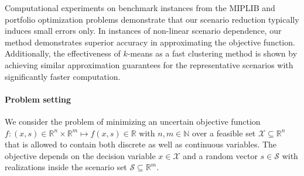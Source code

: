 \documentclass{article}
\newcommand{\mX}{\mathcal{X}}
\newcommand{\mS}{\mathcal{S}}
\newcommand{\R}{\mathbb{R}}
\newcommand{\N}{\mathbb{N}}
\begin{document}
Computational experiments on benchmark instances from the MIPLIB and portfolio optimization problems demonstrate that our scenario reduction typically induces small errors only.
In instances of non-linear scenario dependence, our method demonstrates superior accuracy in approximating the objective function.
Additionally, the effectiveness of $k$-means as a fast clustering method is shown by achieving similar approximation guarantees for the representative scenarios %
with significantly faster computation.


\paragraph*{Problem setting}

We consider the problem of minimizing an uncertain objective function
\(f \colon (x,s) \in \R^n \times \R^m \mapsto f(x,s)\in \R\) with
\(n,m\in \N\) over a feasible set \(\mX\subseteq\R^n\) that is allowed
to contain both discrete as well as continuous variables.
The objective depends on the decision variable \(x\in \mX\) %
and a random vector \(s\in\mS\) with realizations inside the scenario set \(\mS\subseteq\R^m\).
\end{document}

